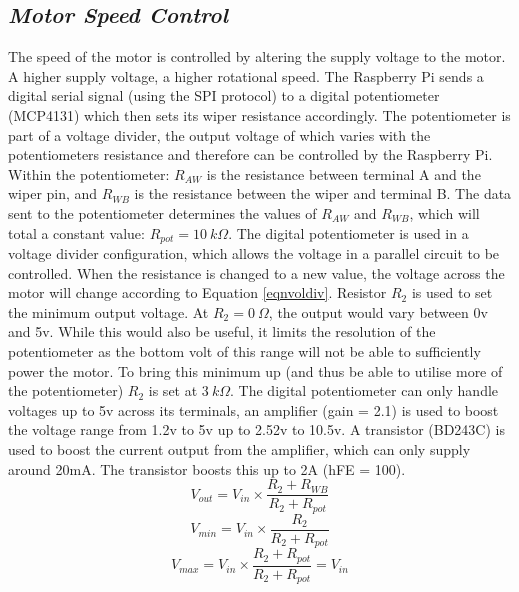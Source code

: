 \documentclass[twoside,a4]{report}
\def\br{\newline \newline \noindent}
\begin{document}
	\subsection*{\textit{Motor Speed Control}} %
	The speed of the motor is controlled by altering the supply voltage to the motor. A higher supply voltage, a higher rotational speed. The Raspberry Pi sends a digital serial signal (using the SPI protocol) to a digital potentiometer (MCP4131) which then sets its wiper resistance accordingly. The potentiometer is part of a voltage divider, the output voltage of which varies with the potentiometers resistance and therefore can be controlled by the Raspberry Pi.\br
	Within the potentiometer: \(R_{AW}\) is the resistance between terminal A and the wiper pin, and \(R_{WB}\) is the resistance between the wiper and terminal B. The data sent to the potentiometer determines the values of \(R_{AW}\) and \(R_{WB}\), which will total a constant value: \(R_{pot} = 10\ k\Omega \). The digital potentiometer is used in a voltage divider configuration, which allows the voltage in a parallel circuit to be controlled. When the resistance is changed to a new value, the voltage across the motor will change according to Equation \ref{eqnvoldiv}. Resistor \(R_2\) is used to set the minimum output voltage. At \(R_2 = 0\ \Omega\), the output would vary between 0v and 5v. While this would also be useful, it limits the resolution of the potentiometer as the bottom volt of this range will not be able to sufficiently power the motor. To bring this minimum up (and thus be able to utilise more of the potentiometer) \(R_2\) is set at \(3\ k\Omega \). The digital potentiometer can only handle voltages up to 5v across its terminals, an amplifier (gain = 2.1) is used to boost the voltage range from 1.2v to 5v up to 2.52v to 10.5v. A transistor (BD243C) is used to boost the current output from the amplifier, which can only supply around 20mA. The transistor boosts this up to 2A (hFE = 100).
	\begin{equation}
		V_{out} = V_{in}\times \frac{R_2 + R_{WB}}{R_2 + R_{pot}}
		\label{eqnvoldiv}
	\end{equation}
	\begin{equation}
		V_{min} = V_{in}\times \frac{R_2}{R_2 + R_{pot}}
		\label{eqnminvol}
	\end{equation}
	\begin{equation}
		V_{max} = V_{in}\times \frac{R_2 + R_{pot}}{R_2 + R_{pot}} = V_{in}
		\label{eqnmaxvol}
	\end{equation}
	
\end{document}
